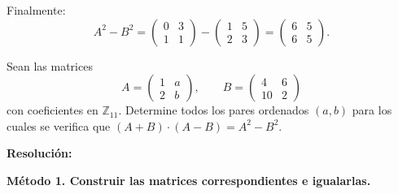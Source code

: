 \documentclass[a4paper,12pt]{article}
\begin{document}
\begin{ejercicio}[title=Ejercicio 1]
Finalmente:
\[
A^2 - B^2 =
\begin{pmatrix}0 & 3\\[2pt]1 & 1\end{pmatrix}
-
\begin{pmatrix}1 & 5\\[2pt]2 & 3\end{pmatrix}
=
\boxed{\begin{pmatrix}6 & 5\\[2pt]6 & 5\end{pmatrix}}.
\]
\end{ejercicio}

\begin{ejercicio}[title=Ejercicio 2]
Sean las matrices 
\[
A = 
\begin{pmatrix}
1 & a\\
2 & b
\end{pmatrix},
\qquad
B =
\begin{pmatrix}
4 & 6\\
10 & 2
\end{pmatrix}
\]
con coeficientes en $\mathbb{Z}_{11}$.
Determine todos los pares ordenados $(a,b)$ para los cuales se verifica que $(A+B)\cdot(A-B)=A^2-B^2$.

\tcblower
\textbf{Resolución:}

\vspace{0.5em}

\textbf{Método 1. Construir las matrices correspondientes e igualarlas.}


\end{ejercicio}
\end{document}
